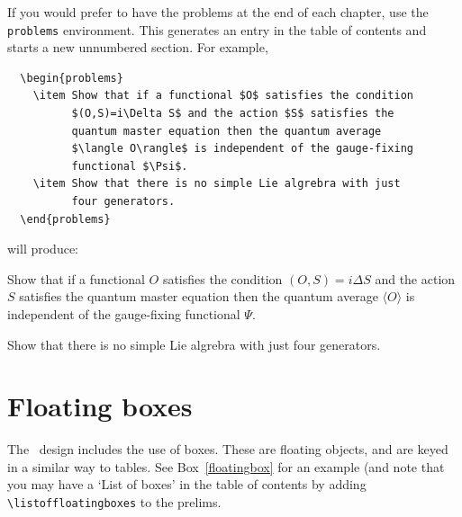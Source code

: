 If you would prefer to have the problems at the end of each chapter, use the \verb"problems" environment. This generates an entry in the table of contents and starts a new unnumbered section. For example,
\begin{verbatim}
  \begin{problems}
    \item Show that if a functional $O$ satisfies the condition
          $(O,S)=i\Delta S$ and the action $S$ satisfies the
          quantum master equation then the quantum average
          $\langle O\rangle$ is independent of the gauge-fixing
          functional $\Psi$.
    \item Show that there is no simple Lie algrebra with just
          four generators.
  \end{problems}
\end{verbatim}
will produce:
  \begin{problems}
    \item Show that if a functional $O$ satisfies the condition
          $(O,S)=i\Delta S$ and the action $S$ satisfies the
          quantum master equation then the quantum average
          $\langle O\rangle$ is independent of the gauge-fixing
          functional $\Psi$.
    \item Show that there is no simple Lie algrebra with just
          four generators.
  \end{problems}


\section{Floating boxes}

The \cambridge\ design includes the use of boxes. These are floating objects, and are keyed in a similar way to tables. See Box~\ref{floatingbox} for an example (and note that you may have a `List of boxes' in the table of contents by adding \verb"\listoffloatingboxes" to the prelims.

